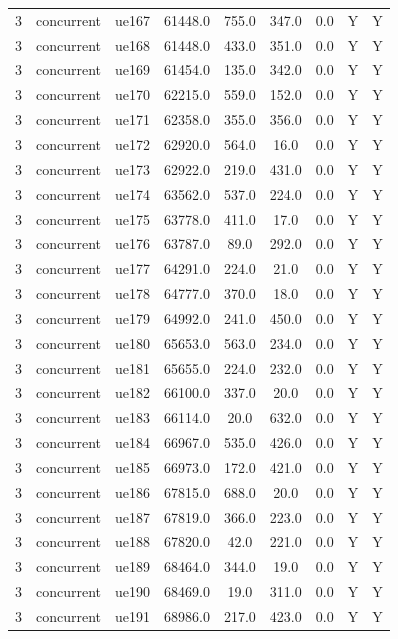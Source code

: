 \begin{table}[ht]
\begin{tabular}{|c|c|c|c|c|c|c|c|c|}
3 & concurrent & ue167 & 61448.0 & 755.0 & 347.0 & 0.0 & Y & Y \\
3 & concurrent & ue168 & 61448.0 & 433.0 & 351.0 & 0.0 & Y & Y \\
3 & concurrent & ue169 & 61454.0 & 135.0 & 342.0 & 0.0 & Y & Y \\
3 & concurrent & ue170 & 62215.0 & 559.0 & 152.0 & 0.0 & Y & Y \\
3 & concurrent & ue171 & 62358.0 & 355.0 & 356.0 & 0.0 & Y & Y \\
3 & concurrent & ue172 & 62920.0 & 564.0 & 16.0 & 0.0 & Y & Y \\
3 & concurrent & ue173 & 62922.0 & 219.0 & 431.0 & 0.0 & Y & Y \\
3 & concurrent & ue174 & 63562.0 & 537.0 & 224.0 & 0.0 & Y & Y \\
3 & concurrent & ue175 & 63778.0 & 411.0 & 17.0 & 0.0 & Y & Y \\
3 & concurrent & ue176 & 63787.0 & 89.0 & 292.0 & 0.0 & Y & Y \\
3 & concurrent & ue177 & 64291.0 & 224.0 & 21.0 & 0.0 & Y & Y \\
3 & concurrent & ue178 & 64777.0 & 370.0 & 18.0 & 0.0 & Y & Y \\
3 & concurrent & ue179 & 64992.0 & 241.0 & 450.0 & 0.0 & Y & Y \\
3 & concurrent & ue180 & 65653.0 & 563.0 & 234.0 & 0.0 & Y & Y \\
3 & concurrent & ue181 & 65655.0 & 224.0 & 232.0 & 0.0 & Y & Y \\
3 & concurrent & ue182 & 66100.0 & 337.0 & 20.0 & 0.0 & Y & Y \\
3 & concurrent & ue183 & 66114.0 & 20.0 & 632.0 & 0.0 & Y & Y \\
3 & concurrent & ue184 & 66967.0 & 535.0 & 426.0 & 0.0 & Y & Y \\
3 & concurrent & ue185 & 66973.0 & 172.0 & 421.0 & 0.0 & Y & Y \\
3 & concurrent & ue186 & 67815.0 & 688.0 & 20.0 & 0.0 & Y & Y \\
3 & concurrent & ue187 & 67819.0 & 366.0 & 223.0 & 0.0 & Y & Y \\
3 & concurrent & ue188 & 67820.0 & 42.0 & 221.0 & 0.0 & Y & Y \\
3 & concurrent & ue189 & 68464.0 & 344.0 & 19.0 & 0.0 & Y & Y \\
3 & concurrent & ue190 & 68469.0 & 19.0 & 311.0 & 0.0 & Y & Y \\
3 & concurrent & ue191 & 68986.0 & 217.0 & 423.0 & 0.0 & Y & Y \\

\end{tabular}
\end{table}

